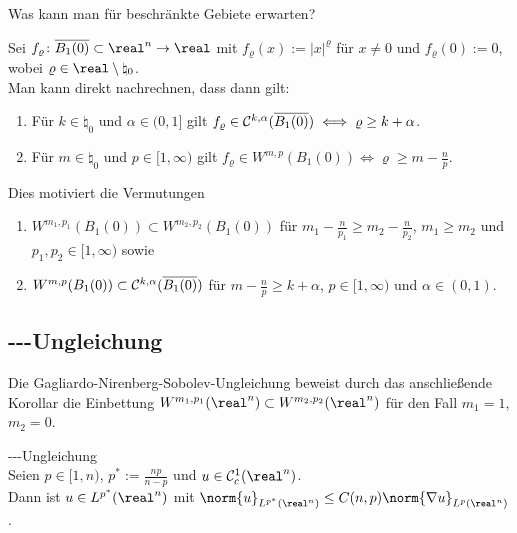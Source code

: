 \begin{Bem}
    Was kann man für beschränkte Gebiete erwarten?
    
    Sei $f_\varrho\colon \overline{B_1(0)} \subset \real^n \to \real$ mit
    $f_\varrho(x) := |x|^\varrho$ für $x \not= 0$ und $f_\varrho(0) := 0$,
    wobei $\varrho \in \real \setminus \natural_0$.\\
    Man kann direkt nachrechnen, dass dann gilt:
    \begin{enumerate}
        \item
        Für $k \in \natural_0$ und $\alpha \in (0, 1]$ gilt
        $f_\varrho \in \mathcal{C}^{k,\alpha}(\overline{B_1(0)}) \iff \varrho \ge k + \alpha$.
        
        \item
        Für $m \in \natural_0$ und $p \in [1, \infty)$ gilt
        $f_\varrho \in W^{m,p}(B_1(0)) \iff \varrho \ge m - \frac{n}{p}$.
    \end{enumerate}
    Dies motiviert die Vermutungen
    \begin{enumerate}
        \item
        $W^{m_1,p_1}(B_1(0)) \subset W^{m_2,p_2}(B_1(0))$ für
        $m_1 - \frac{n}{p_1} \ge m_2 - \frac{n}{p_2}$, $m_1 \ge m_2$ und
        $p_1, p_2 \in [1, \infty)$ sowie
        
        \item
        $W^{m,p}(B_1(0)) \subset \mathcal{C}^{k,\alpha}(\overline{B_1(0)})$ für
        $m - \frac{n}{p} \ge k + \alpha$, $p \in [1, \infty)$ und $\alpha \in (0, 1)$.
    \end{enumerate}
\end{Bem}

\pagebreak

\subsection{%
    ---Ungleichung%
}

\begin{Bem}
    Die Gagliardo-Nirenberg-Sobolev-Ungleichung beweist durch das anschließende Korollar
    die Einbettung $W^{m_1,p_1}(\real^n) \subset W^{m_2,p_2}(\real^n)$ für den Fall
    $m_1 = 1$, $m_2 = 0$.
\end{Bem}

\begin{Satz}{---Ungleichung}\\
    Seien $p \in [1, n)$, $p^\ast := \frac{np}{n - p}$ und $u \in \C^1_c(\real^n)$.\\
    Dann ist $u \in L^{p^\ast}(\real^n)$ mit
    $\norm{u}_{L^{p^\ast}(\real^n)} \le C(n,p) \norm{\nabla u}_{L^p(\real^n)}$.
\end{Satz}

